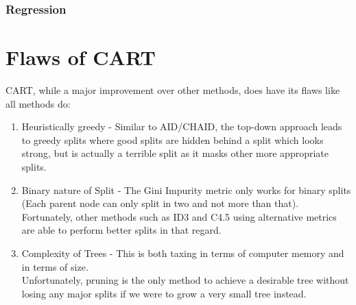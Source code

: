 \documentclass[11pt,a4paper]{report}
\begin{document}
\subsubsection{Regression}




\section{Flaws of CART}
CART, while a major improvement over other methods, does have its flaws like all methods do:
\begin{enumerate}
    \item Heuristically greedy - Similar to AID/CHAID, the top-down approach leads to greedy splits where good splits are hidden behind a split which looks strong, but is actually a terrible split as it masks other more appropriate splits.
    
    \item Binary nature of Split - The Gini Impurity metric only works for binary splits (Each parent node can only split in two and not more than that).\\
    Fortunately, other methods such as ID3 and C4.5 using alternative metrics are able to perform better splits in that regard.
    
    \item Complexity of Trees - This is both taxing in terms of computer memory and in terms of size. \\
    Unfortunately, pruning is the only method to achieve a desirable tree without losing any major splits if we were to grow a very small tree instead.
\end{enumerate}
\end{document}
